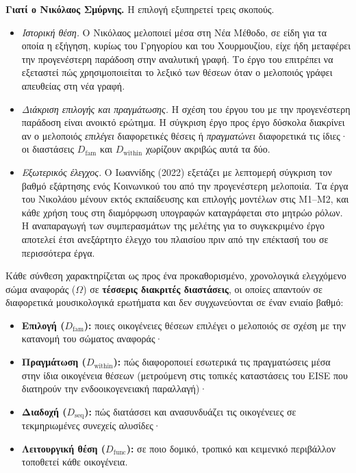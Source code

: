 \documentclass[11pt,a4paper]{article}
\begin{document}
\noindent\textbf{Γιατί ο Νικόλαος Σμύρνης.} Η επιλογή εξυπηρετεί τρεις σκοπούς.
\begin{itemize}
\item \emph{Ιστορική θέση.} Ο Νικόλαος μελοποιεί μέσα στη Νέα Μέθοδο, σε είδη για τα οποία η εξήγηση, κυρίως του Γρηγορίου και του Χουρμουζίου, είχε ήδη μεταφέρει την προγενέστερη παράδοση στην αναλυτική γραφή. Το έργο του επιτρέπει να εξεταστεί πώς χρησιμοποιείται το λεξικό των θέσεων όταν ο μελοποιός γράφει απευθείας στη νέα γραφή.
\item \emph{Διάκριση επιλογής και πραγμάτωσης.} Η σχέση του έργου του με την προγενέστερη παράδοση είναι ανοικτό ερώτημα. Η σύγκριση έργο προς έργο δύσκολα διακρίνει αν ο μελοποιός \emph{επιλέγει} διαφορετικές θέσεις ή \emph{πραγματώνει} διαφορετικά τις ίδιες· οι διαστάσεις $D_{\mathrm{fam}}$ και $D_{\mathrm{within}}$ χωρίζουν ακριβώς αυτά τα δύο.
\item \emph{Εξωτερικός έλεγχος.} Ο Ιωαννίδης (2022) εξετάζει με λεπτομερή σύγκριση τον βαθμό εξάρτησης ενός Κοινωνικού του από την προγενέστερη μελοποιία. Τα έργα του Νικολάου μένουν εκτός εκπαίδευσης και επιλογής μοντέλων στις Μ1--Μ2, και κάθε χρήση τους στη διαμόρφωση υπογραφών καταγράφεται στο μητρώο ρόλων. Η αναπαραγωγή των συμπερασμάτων της μελέτης για το συγκεκριμένο έργο αποτελεί έτσι ανεξάρτητο έλεγχο του πλαισίου πριν από την επέκτασή του σε περισσότερα έργα.
\end{itemize}

Κάθε σύνθεση χαρακτηρίζεται ως προς ένα προκαθορισμένο, χρονολογικά ελεγχόμενο σώμα αναφοράς (\(\Omega\)) σε \textbf{τέσσερις διακριτές διαστάσεις}, οι οποίες απαντούν σε διαφορετικά μουσικολογικά ερωτήματα και δεν συγχωνεύονται σε έναν ενιαίο βαθμό:

\begin{itemize}
\item
  \textbf{Επιλογή (\(D_{\mathrm{fam}}\)):} ποιες οικογένειες θέσεων επιλέγει ο μελοποιός σε σχέση με την κατανομή του σώματος αναφοράς·
\item
  \textbf{Πραγμάτωση (\(D_{\mathrm{within}}\)):} πώς διαφοροποιεί εσωτερικά τις πραγματώσεις μέσα στην ίδια οικογένεια θέσεων (μετρούμενη στις τοπικές καταστάσεις του EISE που διατηρούν την ενδοοικογενειακή παραλλαγή)·
\item
  \textbf{Διαδοχή (\(D_{\mathrm{seq}}\)):} πώς διατάσσει και ανασυνδυάζει τις οικογένειες σε τεκμηριωμένες συνεχείς αλυσίδες·
\item
  \textbf{Λειτουργική θέση (\(D_{\mathrm{func}}\)):} σε ποιο δομικό, τροπικό και κειμενικό περιβάλλον τοποθετεί κάθε οικογένεια.
\end{itemize}
\end{document}

